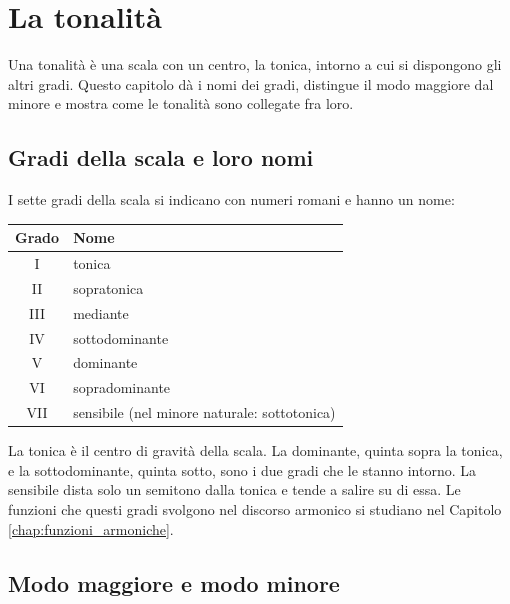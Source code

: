 \chapter{La tonalità}
\label{chap:tonalita}

Una tonalità è una scala con un centro, la tonica, intorno a cui si dispongono gli altri gradi. Questo capitolo dà i nomi dei gradi, distingue il modo maggiore dal minore e mostra come le tonalità sono collegate fra loro.

\section{Gradi della scala e loro nomi}
\label{sec:gradi_scala}

\begin{definizione}
	\label{def:gradi_scala}
	I sette gradi della scala si indicano con numeri romani e hanno un nome:
	\begin{center}
	\begin{tabular}{cl}
	\toprule
	\textbf{Grado} & \textbf{Nome} \\
	\midrule
	I & tonica \\
	II & sopratonica \\
	III & mediante \\
	IV & sottodominante \\
	V & dominante \\
	VI & sopradominante \\
	VII & sensibile (nel minore naturale: sottotonica) \\
	\bottomrule
	\end{tabular}
	\end{center}
\end{definizione}

La tonica è il centro di gravità della scala. La dominante, quinta sopra la tonica, e la sottodominante, quinta sotto, sono i due gradi che le stanno intorno. La sensibile dista solo un semitono dalla tonica e tende a salire su di essa. Le funzioni che questi gradi svolgono nel discorso armonico si studiano nel Capitolo \ref{chap:funzioni_armoniche}.

\section{Modo maggiore e modo minore}
\label{sec:modi}

